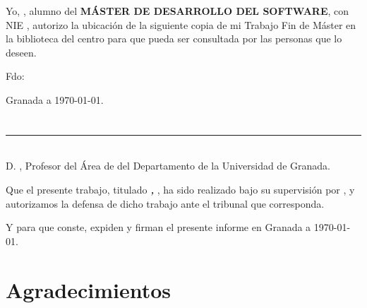 Yo, \textbf{\estudiante}, alumno del \textbf{MÁSTER DE DESARROLLO DEL SOFTWARE}, con NIE \textbf{\dni}, autorizo la ubicación de la siguiente copia de mi Trabajo Fin de Máster en la biblioteca del centro para que pueda ser consultada por las personas que lo deseen.

\vspace{6cm}

\noindent Fdo: \emph{\estudiante}

\vspace{2cm}

\begin{flushright}
Granada a \today.
\end{flushright}


\chapter*{}
\thispagestyle{empty}

\noindent\rule[-1ex]{\textwidth}{2pt}\\[4.5ex]

D. \textbf{\tutorA}, Profesor del Área de {\areaA} del Departamento {\departamentoA} de la Universidad de Granada.

\vspace{0.5cm}


\vspace{0.5cm}


\vspace{0.5cm}

Que el presente trabajo, titulado \textit{\textbf{\tituloTFM, \subtituloTFM}},
ha sido realizado bajo su supervisión por \textbf{\estudiante}, y autorizamos la defensa de dicho trabajo ante el tribunal
que corresponda.

\vspace{0.5cm}

Y para que conste, expiden y firman el presente informe en Granada a \today.

\vspace{1cm}


\vspace{5cm}


\chapter*{Agradecimientos}
\thispagestyle{empty}

\vspace{1cm}



